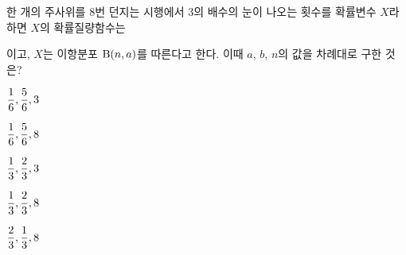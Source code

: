 한 개의 주사위를 8번 던지는 시행에서 3의 배수의 눈이 나오는 횟수를 확률변수 $X$라 하면 $X$의 확률질량함수는\par\smallskip{}\par\smallskip\noindent 이고, $X$는 이항분포 $\mathrm{B}(n{,}\mkern3mu\mathopen{}a)$를 따른다고 한다. 이때 $a$, $b$, $n$의 값을 차례대로 구한 것은? 
\begin{choices32}{\rule[-3ex]{0pt}{8ex}$\dfrac{1}{6}{,}\mkern3mu\mathopen{}\dfrac{5}{6}{,}\mkern3mu\mathopen{}3$}{\rule[-3ex]{0pt}{8ex}$\dfrac{1}{6}{,}\mkern3mu\mathopen{}\dfrac{5}{6}{,}\mkern3mu\mathopen{}8$}{\rule[-3ex]{0pt}{8ex}$\dfrac{1}{3}{,}\mkern3mu\mathopen{}\dfrac{2}{3}{,}\mkern3mu\mathopen{}3$}{\rule[-3ex]{0pt}{8ex}$\dfrac{1}{3}{,}\mkern3mu\mathopen{}\dfrac{2}{3}{,}\mkern3mu\mathopen{}8$}{\rule[-3ex]{0pt}{8ex}$\dfrac{2}{3}{,}\mkern3mu\mathopen{}\dfrac{1}{3}{,}\mkern3mu\mathopen{}8$}\end{choices32}
